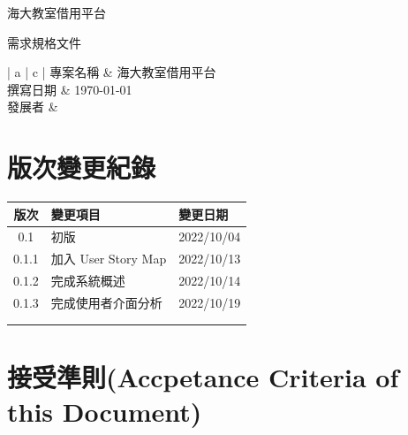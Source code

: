 \documentclass{article}
\begin{document}
\begin{titlepage}
	\centering

	{\huge 海大教室借用平台}

	\vfill

	{\huge 需求規格文件}

	\vfill

	\begin{Large}
		\begin{center}
			\begin{tabular}{| a | c |}
				\hline
				專案名稱 & 海大教室借用平台               \\ \hline
				撰寫日期 & \today                 \\ \hline
				發展者  &  \\ \hline
			\end{tabular}
		\end{center}
	\end{Large}
\end{titlepage}


\section*{版次變更紀錄}

\begin{tabularx}{\textwidth}{| c | X | X |}
	\rowcolor{LightGray}
	\hline
	版次    & 變更項目              & 變更日期       \\ \hline
	0.1   & 初版                & 2022/10/04 \\ \hline
	0.1.1 & 加入 User Story Map & 2022/10/13 \\ \hline
	0.1.2 & 完成系統概述            & 2022/10/14 \\ \hline
	0.1.3 & 完成使用者介面分析       & 2022/10/19           \\ \hline
	      &                   &            \\ \hline
	      &                   &            \\ \hline
\end{tabularx}

\newpage

\begin{center}
	\tableofcontents
\end{center}

\newpage

\section[接受準則(ACCEPTANCE CRITERIA OF THIS DOCUMENT)]{接受準則(Accpetance Criteria of this Document)}
\end{document}

